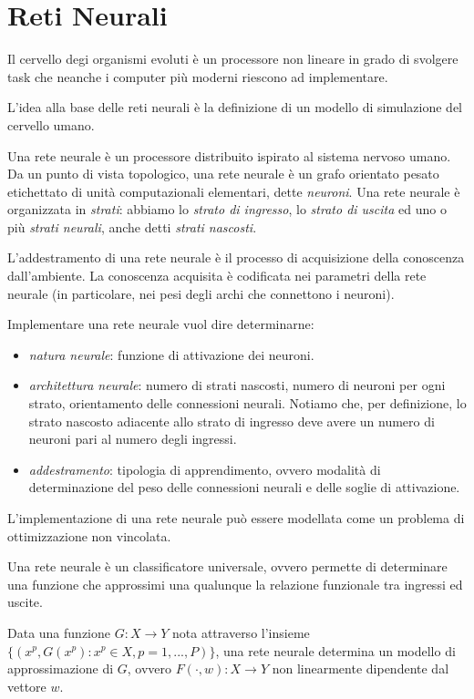 \chapter{Reti Neurali}
\label{chp:neural-networks}
Il cervello degi organismi evoluti è un processore non lineare in grado di svolgere task che neanche i computer più moderni riescono ad implementare.

L'idea alla base delle reti neurali è la definizione di un modello di simulazione del cervello umano.

Una rete neurale è un processore distribuito ispirato al sistema nervoso umano.
Da un punto di vista topologico, una rete neurale è un grafo orientato pesato etichettato di unità computazionali elementari, dette \textit{neuroni}.
Una rete neurale è organizzata in \textit{strati}: abbiamo lo \textit{strato di ingresso}, lo \textit{strato di uscita} ed uno o più \textit{strati neurali}, anche detti \textit{strati nascosti}.

L'addestramento di una rete neurale è il processo di acquisizione della conoscenza dall'ambiente. La conoscenza acquisita è codificata nei parametri della rete neurale (in particolare, nei pesi degli archi che connettono i neuroni).

Implementare una rete neurale vuol dire determinarne:

\begin{itemize}
  \item \textit{natura neurale}: funzione di attivazione dei neuroni.
  \item \textit{architettura neurale}: numero di strati nascosti, numero di neuroni per ogni strato, orientamento delle connessioni neurali. Notiamo che, per definizione, lo strato nascosto adiacente allo strato di ingresso deve avere un numero di neuroni pari al numero degli ingressi.
  \item \textit{addestramento}: tipologia di apprendimento, ovvero modalità di determinazione del peso delle connessioni neurali e delle soglie di attivazione.
\end{itemize}

L'implementazione di una rete neurale può essere modellata come un problema di ottimizzazione non vincolata.

Una rete neurale è un classificatore universale, ovvero permette di determinare una funzione che approssimi una qualunque la relazione funzionale tra ingressi ed uscite.

Data una funzione $G:X\rightarrow Y$ nota attraverso l'insieme $\{(x^{p},G(x^{p}):x^{p}\in X, p=1,...,P)\}$, una rete neurale determina un modello di approssimazione di $G$, ovvero $F(\cdot,w):X\rightarrow Y$ non linearmente dipendente dal vettore $w$.

